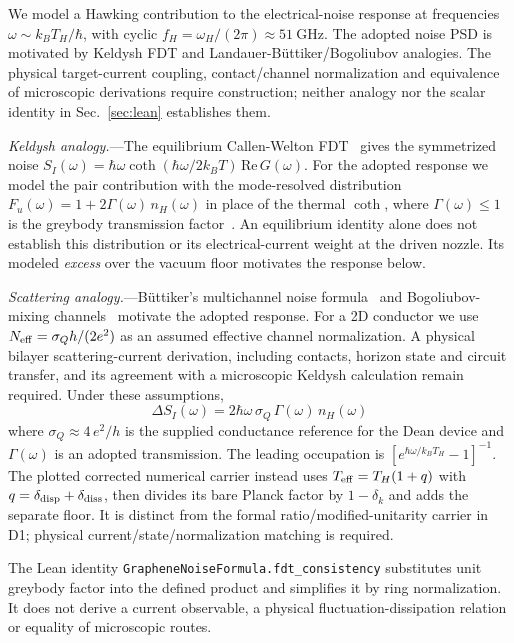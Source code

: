 \documentclass[aps,prd,twocolumn,showpacs,superscriptaddress,nofootinbib]{revtex4-2}
\begin{document}
We model a Hawking contribution to the electrical-noise response at frequencies
$\omega\sim k_BT_H/\hbar$, with cyclic
$f_H=\omega_H/(2\pi)\approx\SI{51}{\giga\hertz}$. The adopted
noise PSD is motivated by Keldysh FDT and Landauer-B\"uttiker/Bogoliubov
analogies. The physical target-current coupling, contact/channel normalization
and equivalence of microscopic derivations require construction; neither
analogy nor the scalar identity in Sec.~\ref{sec:lean} establishes them.

\textit{Keldysh analogy.}---The equilibrium Callen-Welton
FDT~\cite{CallenWelton1951} gives the symmetrized noise
$S_I(\omega) = \hbar\omega\coth(\hbar\omega/2k_BT)\,\mathrm{Re}\,G(\omega)$.
For the adopted response we model the pair contribution with the
mode-resolved distribution $F_u(\omega) = 1 + 2\Gamma(\omega)\,n_H(\omega)$
in place of the thermal $\coth$,
where $\Gamma(\omega) \leq 1$ is the greybody transmission
factor~\cite{AndersonBFP2014Graybody}. An equilibrium identity alone does not
establish this distribution or its electrical-current weight at the driven
nozzle. Its modeled \emph{excess} over the vacuum floor motivates the
response below.

\textit{Scattering analogy.}---B\"uttiker's multichannel noise
formula~\cite{Blanter2000} and Bogoliubov-mixing
channels~\cite{AnantramDatta1996} motivate the adopted response. For a 2D conductor we use
$N_{\rm eff} = \sigma_Q h/(2e^2)$ as an assumed effective channel
normalization. A physical bilayer scattering-current derivation, including
contacts, horizon state and circuit transfer, and its agreement with a
microscopic Keldysh calculation remain required. Under these assumptions,
\begin{equation}
\boxed{\;\Delta S_I(\omega) = 2\hbar\omega\,\sigma_Q\,\Gamma(\omega)\,
n_H(\omega)\;}
\label{eq:noise_psd}
\end{equation}
where $\sigma_Q\approx4\,e^2/h$ is the supplied conductance reference
for the Dean device and $\Gamma(\omega)$ is an adopted transmission.
The leading occupation is $[e^{\hbar\omega/k_BT_H}-1]^{-1}$.
The plotted corrected numerical carrier instead uses
$T_{\rm eff}=T_H(1+q)$ with $q=\delta_{\rm disp}+\delta_{\rm diss}$,
then divides its bare Planck factor by $1-\delta_k$ and adds the
separate floor. It is distinct from the formal ratio/modified-unitarity
carrier in D1; physical current/state/normalization matching is required.

The Lean identity \texttt{GrapheneNoiseFormula.fdt\_consistency} substitutes
unit greybody factor into the defined product and simplifies it by ring
normalization. It does not derive a current observable, a physical
fluctuation-dissipation relation or equality of microscopic routes.
\end{document}
